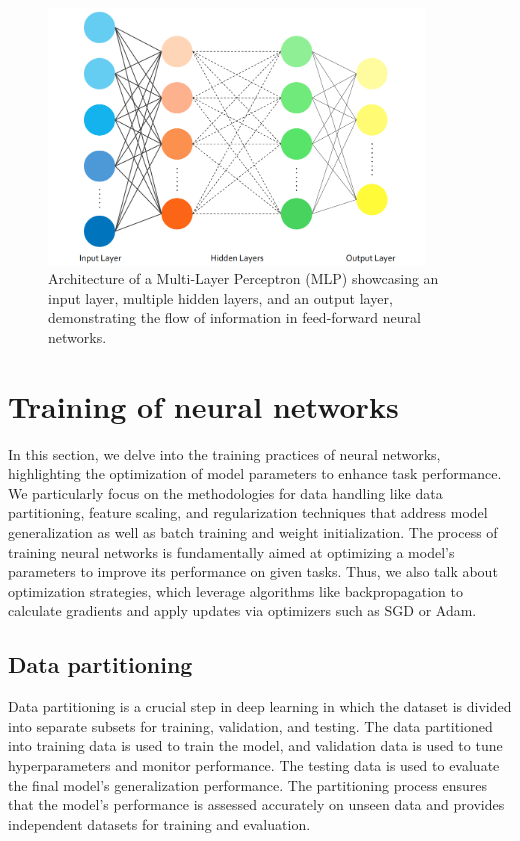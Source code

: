 \begin{figure}[ht]
    \centering
    \includegraphics[width=10cm]{images/Theory-DL/MLP.png}
    \caption{Architecture of a Multi-Layer Perceptron (MLP) showcasing an input layer, multiple hidden layers, and an output layer, demonstrating the flow of information in feed-forward neural networks.}
    \label{fig:MLP}
  \end{figure}
\section{Training of neural networks}\label{optrain}
In this section, we delve into the training practices of neural networks, highlighting the optimization of model parameters to enhance task performance. We particularly focus on the methodologies for data handling like data partitioning, feature scaling, and regularization techniques that address model generalization as well as batch training and weight initialization.
The process of training neural networks is fundamentally aimed at optimizing a model's parameters to improve its performance on given tasks. Thus, we also talk about optimization strategies, which leverage algorithms like backpropagation to calculate gradients and apply updates via optimizers such as SGD or Adam.
\subsection{Data partitioning}Data partitioning is a crucial step in deep learning in which the dataset is divided into separate subsets for training, validation, and testing. The data partitioned into training data is used to train the model, and validation data is used to tune hyperparameters and monitor performance. The testing data is used to evaluate the final model's generalization performance. The partitioning process ensures that the model's performance is assessed accurately on unseen data and provides independent datasets for training and evaluation. 
